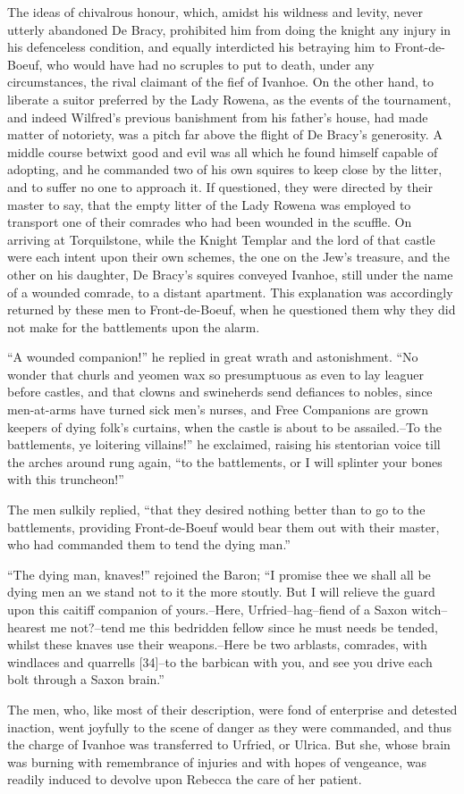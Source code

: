 The ideas of chivalrous honour, which, amidst his wildness and levity,
never utterly abandoned De Bracy, prohibited him from doing the knight
any injury in his defenceless condition, and equally interdicted his
betraying him to Front-de-Boeuf, who would have had no scruples to put
to death, under any circumstances, the rival claimant of the fief of
Ivanhoe. On the other hand, to liberate a suitor preferred by the Lady
Rowena, as the events of the tournament, and indeed Wilfred's previous
banishment from his father's house, had made matter of notoriety, was a
pitch far above the flight of De Bracy's generosity. A middle course
betwixt good and evil was all which he found himself capable of
adopting, and he commanded two of his own squires to keep close by the
litter, and to suffer no one to approach it. If questioned, they were
directed by their master to say, that the empty litter of the Lady
Rowena was employed to transport one of their comrades who had been
wounded in the scuffle. On arriving at Torquilstone, while the Knight
Templar and the lord of that castle were each intent upon their own
schemes, the one on the Jew's treasure, and the other on his daughter,
De Bracy's squires conveyed Ivanhoe, still under the name of a wounded
comrade, to a distant apartment. This explanation was accordingly
returned by these men to Front-de-Boeuf, when he questioned them why
they did not make for the battlements upon the alarm.

``A wounded companion!'' he replied in great wrath and astonishment.
``No wonder that churls and yeomen wax so presumptuous as even to lay
leaguer before castles, and that clowns and swineherds send defiances to
nobles, since men-at-arms have turned sick men's nurses, and Free
Companions are grown keepers of dying folk's curtains, when the castle
is about to be assailed.--To the battlements, ye loitering villains!''
he exclaimed, raising his stentorian voice till the arches around rung
again, ``to the battlements, or I will splinter your bones with this
truncheon!''

The men sulkily replied, ``that they desired nothing better than to go
to the battlements, providing Front-de-Boeuf would bear them out with
their master, who had commanded them to tend the dying man.''

``The dying man, knaves!'' rejoined the Baron; ``I promise thee we shall
all be dying men an we stand not to it the more stoutly. But I will
relieve the guard upon this caitiff companion of yours.--Here,
Urfried--hag--fiend of a Saxon witch--hearest me not?--tend me this
bedridden fellow since he must needs be tended, whilst these knaves use
their weapons.--Here be two arblasts, comrades, with windlaces and
quarrells {[}34{]}--to the barbican with you, and see you drive each
bolt through a Saxon brain.''

The men, who, like most of their description, were fond of enterprise
and detested inaction, went joyfully to the scene of danger as they were
commanded, and thus the charge of Ivanhoe was transferred to Urfried, or
Ulrica. But she, whose brain was burning with remembrance of injuries
and with hopes of vengeance, was readily induced to devolve upon Rebecca
the care of her patient.
